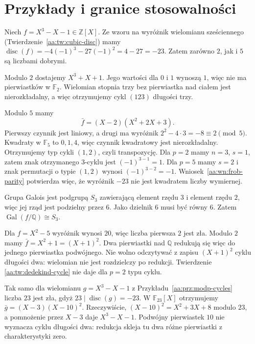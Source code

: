 \section{Przykłady i granice stosowalności}
\begin{przyklad}\label{aa:prz:modp-cycles}
Niech $f=X^3-X-1\in\mathbb Z[X]$.
Ze wzoru na wyróżnik wielomianu sześciennego
(Twierdzenie~\ref{aa:tw:cubic-disc}) mamy
$\operatorname{disc}(f)=-4(-1)^3-27(-1)^2=4-27=-23$.
Zatem zarówno $2$, jak i $5$ są liczbami dobrymi.

Modulo $2$ dostajemy $X^3+X+1$. Jego wartości dla
$0$ i $1$ wynoszą $1$, więc nie ma pierwiastków
w $\mathbb F_2$. Wielomian stopnia trzy bez pierwiastka
nad ciałem jest nierozkładalny, a więc otrzymujemy cykl
$(123)$ długości trzy.

Modulo $5$ mamy
\[
 \bar f=(X-2)(X^2+2X+3).
\]
Pierwszy czynnik jest liniowy, a drugi ma wyróżnik
$2^2-4\cdot3= -8\equiv2\pmod5$.
Kwadraty w $\mathbb F_5$ to $0,1,4$, więc czynnik
kwadratowy jest nierozkładalny. Otrzymujemy typ cykli
$(1,2)$, czyli transpozycję.
Dla $p=2$ mamy $n=3$, $s=1$, zatem znak otrzymanego
$3$-cyklu jest $(-1)^{3-1}=1$. Dla $p=5$ mamy $s=2$ i
znak permutacji o typie $(1,2)$ wynosi $(-1)^{3-2}=-1$.
Wniosek~\ref{aa:wn:frob-parity} potwierdza więc, że
wyróżnik $-23$ nie jest kwadratem liczby wymiernej.

Grupa Galois jest podgrupą $S_3$ zawierającą element
rzędu $3$ i element rzędu $2$, więc jej rząd
jest podzielny przez $6$. Jako dzielnik $6$ musi być
równy $6$. Zatem $\operatorname{Gal}(f/\mathbb Q)\cong S_3$.
\end{przyklad}

\begin{przyklad}\label{aa:prz:bad-prime}
Dla $f=X^2-5$ wyróżnik wynosi $20$, więc liczba pierwsza
$2$ jest zła. Modulo $2$ mamy
$\bar f=X^2+1=(X+1)^2$.
Dwa pierwiastki nad $\mathbb Q$ redukują się więc do
jednego pierwiastka podwójnego. Nie wolno odczytywać
z zapisu $(X+1)^2$ cyklu długości dwa: wielomian
nie jest rozdzielczy po redukcji. Twierdzenie
\ref{aa:tw:dedekind-cycle} nie daje dla $p=2$ typu cyklu.

Tak samo dla wielomianu $g=X^3-X-1$ z
Przykładu~\ref{aa:prz:modp-cycles} liczba $23$ jest zła,
gdyż $23\mid\operatorname{disc}(g)=-23$.
W $\mathbb F_{23}[X]$ otrzymujemy
$\bar g=(X-3)(X-10)^2$. Rzeczywiście,
$(X-10)^2=X^2+3X+8$ modulo $23$, a pomnożenie
przez $X-3$ daje $X^3-X-1$.
Podwójny pierwiastek $10$ nie wyznacza cyklu długości dwa:
redukcja skleja tu dwa różne pierwiastki z charakterystyki zero.
\end{przyklad}

